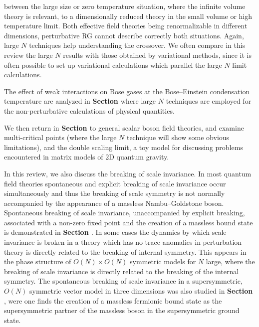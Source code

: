 between the large size or zero temperature situation, where the
infinite volume theory is relevant, to a dimensionally reduced
theory in the small volume or high temperature limit. Both
effective field theories being renormalizable in different
dimensions, perturbative RG cannot describe correctly both
situations. Again, large $N$ techniques help    understanding
the crossover. We often compare in this review the large $N$
results with those obtained by variational methods, since it is
often possible to set up variational calculations which parallel
the large $N$ limit calculations.\par
The effect of weak  interactions on Bose gases at the Bose--Einstein condensation temperature are analyzed in {\bf Section \label{\scBEC}} where large $N$ techniques are
employed for the non-perturbative calculations of physical
quantities.
\par
We then return  in {\bf Section \label{\ssdblescal}} to general scalar boson field theories,
and examine multi-critical points (where the large $N$ technique
will show some obvious limitations), and the double scaling limit,
a toy model for discussing problems encountered in matrix models
of 2D quantum gravity.
\par
In  this review, we also discuss the breaking of scale
invariance. In most quantum field theories spontaneous and
explicit breaking of scale invariance  occur simultaneously and
thus the breaking of scale symmetry is not normally accompanied by
the appearance of a massless Nambu--Goldstone boson. Spontaneous
breaking of scale invariance, unaccompanied by explicit breaking,
associated with a non-zero fixed point and the creation of a
massless bound state is demonstrated in {\bf Section \label{\ssNscaleinv}}.
In some cases the dynamics by which scale invariance is broken in
a theory which has no trace anomalies in perturbation theory is
directly related to the breaking of internal symmetry. This
appears in the phase structure of $O(N)\times O(N)$
symmetric models  for $N$ large, where the breaking of scale invariance is
directly related to the breaking of the internal symmetry.
The spontaneous breaking of scale invariance in a supersymmetric,
$O(N)$ symmetric vector model in three dimensions was also studied
in {\bf Section \label{\ssNSUSYsc}},
were one finds the creation of a massless fermionic bound state as
the supersymmetric partner of the massless boson in the
supersymmetric ground state.
 \par




